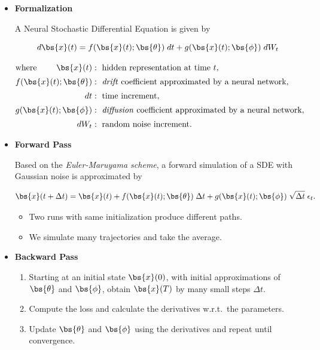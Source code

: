 \begin{itemize}

\item \textbf{Formalization}

A Neural Stochastic Differential Equation is given by

\begin{equation}\label{NeuralSDE}
d\bs{x}(t) = f(\bs{x}(t); \bs{\theta}) \; dt + g(\bs{x}(t); \bs{\phi}) \; dW_t
\end{equation}

\begin{align*}
\text{where } \qquad \bs{x}(t) &: \text{ hidden representation at time }t, \\[0.2em]
f(\bs{x}(t); \bs{\theta}) &: \text{ \textit{drift} coefficient approximated by a neural network}, \\[0.2em]
dt &: \text{ time increment}, \\[0.2em]
g(\bs{x}(t); \bs{\phi}) &: \text{ \textit{diffusion} coefficient approximated by a neural network}, \\[0.2em]
dW_t &: \text{ random noise increment.}
\end{align*}


\item \textbf{Forward Pass}

Based on the \textit{Euler-Maruyama scheme}, a forward simulation of a SDE with Gaussian noise is approximated by

\begin{equation}\label{Euler-Maruyama_ForwardPass}
\bs{x}(t+\Delta t)
=
\bs{x}(t)
+
f(\bs{x}(t); \bs{\theta}) \; \Delta t
+
g(\bs{x}(t); \bs{\phi}) \; \sqrt{\Delta t} \; \epsilon_t.
\end{equation}

\begin{itemize}

\item Two runs with same initialization produce different paths.

\item We simulate many trajectories and take the average.

\end{itemize}

\newpage

\item \textbf{Backward Pass}

\begin{enumerate}

\item Starting at an initial state $\bs{x}(0)$, with initial approximations of $\bs{\theta}$ and $\bs{\phi}$, obtain $\bs{x}(T)$ by many small steps $\Delta t$.

\item Compute the loss and calculate the derivatives w.r.t.\ the parameters.

\item Update $\bs{\theta}$ and $\bs{\phi}$ using the derivatives and repeat until convergence.

\end{enumerate}

\end{itemize}

